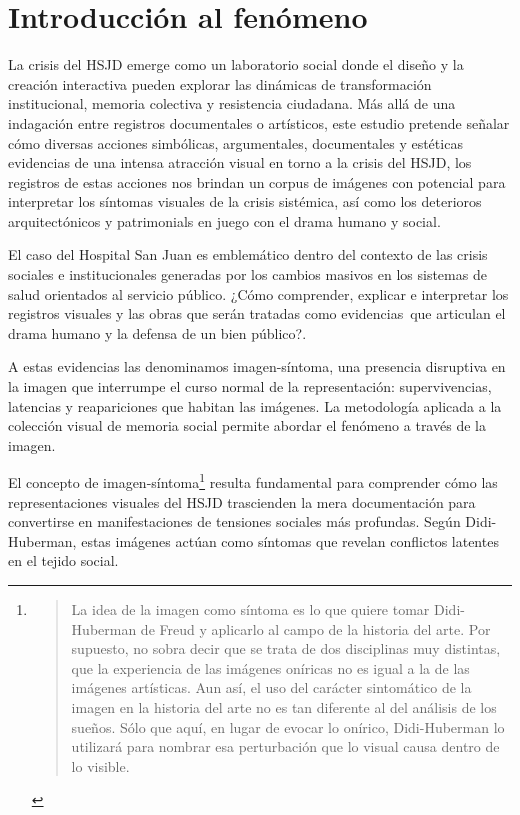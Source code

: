 \section*{Introducción al fenómeno}

La crisis del HSJD emerge como un laboratorio social donde el diseño y la creación interactiva pueden explorar las dinámicas de transformación institucional, memoria colectiva y resistencia ciudadana. Más allá de una indagación entre registros documentales o artísticos, este estudio pretende señalar cómo diversas acciones simbólicas, argumentales, documentales y estéticas evidencias de una intensa atracción visual en torno a la crisis del HSJD, los registros de estas acciones nos brindan un corpus de imágenes con potencial para interpretar los síntomas visuales de la crisis sistémica, así como los deterioros arquitectónicos y patrimonials en juego con el drama humano y social.

El caso del Hospital San Juan es emblemático dentro del contexto de las crisis sociales e institucionales generadas por los cambios masivos en los sistemas de salud orientados al servicio público. ¿Cómo comprender, explicar e interpretar los registros visuales y las obras que serán tratadas como \guillemotleft evidencias\guillemotright\ que articulan el drama humano y la defensa de un bien público?. 

A estas evidencias las denominamos imagen-síntoma, una presencia disruptiva en la imagen que interrumpe el curso normal de la representación: supervivencias, latencias y reapariciones que habitan las imágenes. La metodología aplicada a la colección visual de memoria social permite abordar el fenómeno a través de la imagen.

El concepto de imagen-síntoma\footnote{\begin{quote}La idea de la imagen como síntoma es lo que quiere tomar Didi-Huberman de Freud y aplicarlo al campo de la historia del arte. Por supuesto, no sobra decir que se trata de dos disciplinas muy distintas, que la experiencia de las imágenes oníricas no es igual a la de las imágenes artísticas. Aun así, el uso del carácter sintomático de la imagen en la historia del arte no es tan diferente al del análisis de los sueños. Sólo que aquí, en lugar de evocar lo onírico, Didi-Huberman lo utilizará para nombrar esa perturbación que lo visual causa dentro de lo visible. \parencite[p. 37]{VegaArevalo2017}\end{quote}} resulta fundamental para comprender cómo las representaciones visuales del HSJD trascienden la mera documentación para convertirse en manifestaciones de tensiones sociales más profundas. Según Didi-Huberman, estas imágenes actúan como síntomas que revelan conflictos latentes en el tejido social.

